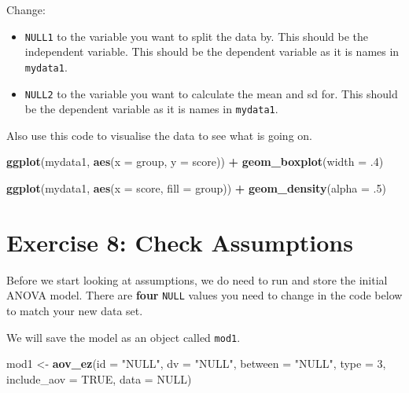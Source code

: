 \documentclass[
]{book}
\newenvironment{Shaded}{\begin{snugshade}}{\end{snugshade}}
\newcommand{\AttributeTok}[1]{\textcolor[rgb]{0.13,0.29,0.53}{#1}}
\newcommand{\ConstantTok}[1]{\textcolor[rgb]{0.56,0.35,0.01}{#1}}
\newcommand{\DecValTok}[1]{\textcolor[rgb]{0.00,0.00,0.81}{#1}}
\newcommand{\FunctionTok}[1]{\textcolor[rgb]{0.13,0.29,0.53}{\textbf{#1}}}
\newcommand{\NormalTok}[1]{#1}
\newcommand{\OtherTok}[1]{\textcolor[rgb]{0.56,0.35,0.01}{#1}}
\newcommand{\SpecialCharTok}[1]{\textcolor[rgb]{0.81,0.36,0.00}{\textbf{#1}}}
\newcommand{\StringTok}[1]{\textcolor[rgb]{0.31,0.60,0.02}{#1}}
\let\oldsection\section
\renewcommand{\section}{\needspace{5\baselineskip}\oldsection}
\begin{document}
Change:

\begin{itemize}
\item
  \texttt{NULL1} to the variable you want to split the data by. This should be the independent variable. This should be the dependent variable as it is names in \texttt{mydata1}.
\item
  \texttt{NULL2} to the variable you want to calculate the mean and sd for. This should be the dependent variable as it is names in \texttt{mydata1}.
\end{itemize}

Also use this code to visualise the data to see what is going on.

\begin{Shaded}
\begin{Highlighting}[]
\FunctionTok{ggplot}\NormalTok{(mydata1, }\FunctionTok{aes}\NormalTok{(}\AttributeTok{x =}\NormalTok{ group, }\AttributeTok{y =}\NormalTok{ score)) }\SpecialCharTok{+}
  \FunctionTok{geom\_boxplot}\NormalTok{(}\AttributeTok{width =}\NormalTok{ .}\DecValTok{4}\NormalTok{)}
  
\FunctionTok{ggplot}\NormalTok{(mydata1, }\FunctionTok{aes}\NormalTok{(}\AttributeTok{x =}\NormalTok{ score, }\AttributeTok{fill =}\NormalTok{ group)) }\SpecialCharTok{+}
  \FunctionTok{geom\_density}\NormalTok{(}\AttributeTok{alpha =}\NormalTok{ .}\DecValTok{5}\NormalTok{)}
\end{Highlighting}
\end{Shaded}

\section{Exercise 8: Check Assumptions}\label{exercise-8-check-assumptions}

Before we start looking at assumptions, we do need to run and store the initial ANOVA model. There are \textbf{four} \texttt{NULL} values you need to change in the code below to match your new data set.

We will save the model as an object called \texttt{mod1}.

\begin{Shaded}
\begin{Highlighting}[]
\NormalTok{mod1 }\OtherTok{\textless{}{-}} \FunctionTok{aov\_ez}\NormalTok{(}\AttributeTok{id =} \StringTok{"NULL"}\NormalTok{,}
              \AttributeTok{dv =} \StringTok{"NULL"}\NormalTok{,}
              \AttributeTok{between =} \StringTok{"NULL"}\NormalTok{,}
              \AttributeTok{type =} \DecValTok{3}\NormalTok{,}
              \AttributeTok{include\_aov =} \ConstantTok{TRUE}\NormalTok{,}
              \AttributeTok{data =} \ConstantTok{NULL}\NormalTok{)}
\end{Highlighting}
\end{Shaded}
\end{document}
